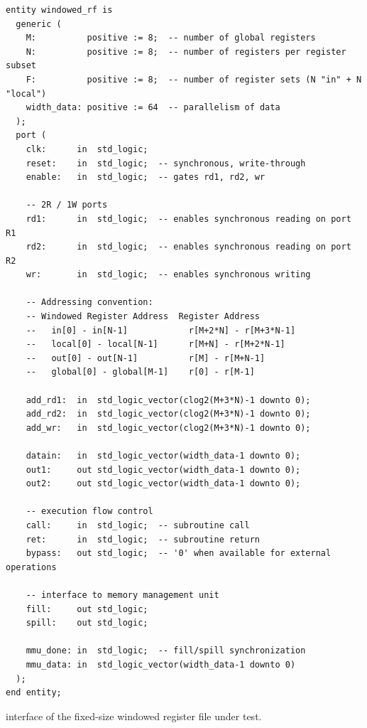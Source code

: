 \begin{listing}
\begin{verbatim}
entity windowed_rf is
  generic (
    M:          positive := 8;  -- number of global registers
    N:          positive := 8;  -- number of registers per register subset 
    F:          positive := 8;  -- number of register sets (N "in" + N "local")
    width_data: positive := 64  -- parallelism of data
  );
  port (
    clk:      in  std_logic;
    reset:    in  std_logic;  -- synchronous, write-through
    enable:   in  std_logic;  -- gates rd1, rd2, wr

    -- 2R / 1W ports 
    rd1:      in  std_logic;  -- enables synchronous reading on port R1
    rd2:      in  std_logic;  -- enables synchronous reading on port R2
    wr:       in  std_logic;  -- enables synchronous writing

    -- Addressing convention:
    -- Windowed Register Address  Register Address
    --   in[0] - in[N-1]            r[M+2*N] - r[M+3*N-1]
    --   local[0] - local[N-1]      r[M+N] - r[M+2*N-1]
    --   out[0] - out[N-1]          r[M] - r[M+N-1]
    --   global[0] - global[M-1]    r[0] - r[M-1]

    add_rd1:  in  std_logic_vector(clog2(M+3*N)-1 downto 0);
    add_rd2:  in  std_logic_vector(clog2(M+3*N)-1 downto 0);
    add_wr:   in  std_logic_vector(clog2(M+3*N)-1 downto 0);

    datain:   in  std_logic_vector(width_data-1 downto 0);
    out1:     out std_logic_vector(width_data-1 downto 0);
    out2:     out std_logic_vector(width_data-1 downto 0);

    -- execution flow control
    call:     in  std_logic;  -- subroutine call
    ret:      in  std_logic;  -- subroutine return
    bypass:   out std_logic;  -- '0' when available for external operations

    -- interface to memory management unit
    fill:     out std_logic;
    spill:    out std_logic;

    mmu_done: in  std_logic;  -- fill/spill synchronization
    mmu_data: in  std_logic_vector(width_data-1 downto 0)
  );
end entity;
\end{verbatim}
\caption{\vhdl interface of the fixed-size windowed register file under test.}
\label{list:dut_wrf}
\end{listing}

